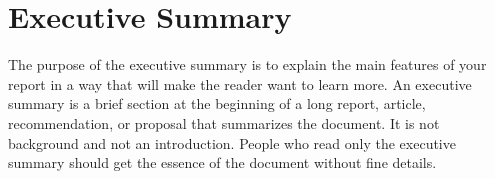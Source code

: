 \chapter{Executive Summary\label{chap:exec}}

The purpose of the executive summary is to explain the main features of your report in a way that will make the reader want to learn more. An executive summary is a brief section at the beginning of a long report, article, recommendation, or proposal that summarizes the document. It is not background and not an introduction. People who read only the executive summary should get the essence of the document without fine details.